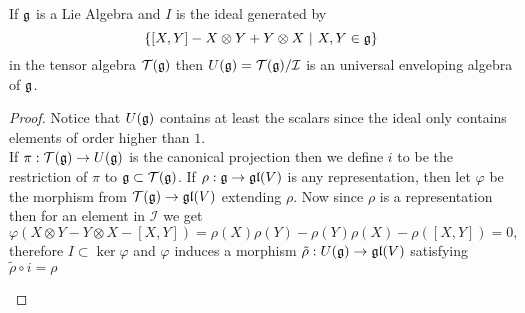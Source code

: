 \begin{prop}
	If $\mathfrak{g}$ is a Lie Algebra and $I$ is the ideal generated by $$\{[X,Y]-X\otimes Y + Y \otimes X \ | \ X,Y \in \mathfrak{g}\}$$ in the tensor algebra $\mathcal{T}(\mathfrak{g})$ then $U(\mathfrak{g})=\mathcal{T}(\mathfrak{g})/\mathcal{I}$ is an universal enveloping algebra of $\mathfrak{g}$.
\end{prop}
\begin{proof}
	Notice that $U(\mathfrak{g})$ contains at least the scalars since the ideal only contains elements of order higher than $1$.\\
	If $\pi : \mathcal{T}(\mathfrak{g}) \rightarrow U(\mathfrak{g})$ is the canonical projection then we define $i$ to be the restriction of $\pi$ to $\mathfrak{g} \subset \mathcal{T}(\mathfrak{g})$.
	If $\rho: \mathfrak{g} \rightarrow \mathfrak{gl}(V)$ is any representation, then let $\varphi$ be the morphism from $\mathcal{T}(\mathfrak{g}) \rightarrow \mathfrak{gl}(V)$ extending $\rho$. Now since $\rho$ is a representation then for an element in $\mathcal{I}$ we get
	$$ \varphi(X \otimes Y - Y \otimes X - [X,Y])= \rho(X)\rho(Y) - \rho(Y)\rho(X) - \rho([X,Y])=0,$$
	therefore $I \subset \ker \varphi$ and $\varphi$ induces a morphism $\tilde{\rho}:U(\mathfrak{g})\rightarrow \mathfrak{gl}(V)$ satisfying $ \tilde{\rho} \circ i = \rho$
	\begin{center}
	\end{center}
\end{proof}